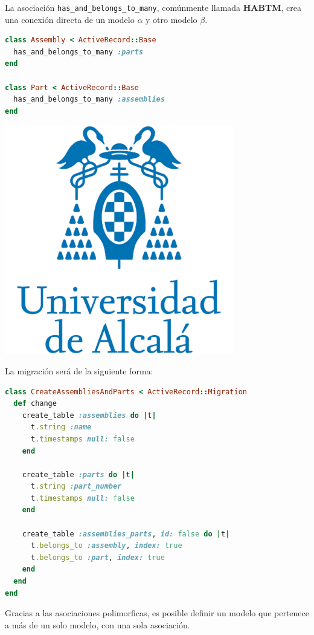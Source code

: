 La asociación \texttt{has\_and\_belongs\_to\_many}, comúnmente llamada \textbf{HABTM}, crea una conexión directa de un modelo $\alpha$ y otro modelo $\beta$.

\begin{lstlisting}[language=Ruby]
class Assembly < ActiveRecord::Base
  has_and_belongs_to_many :parts
end
 
class Part < ActiveRecord::Base
  has_and_belongs_to_many :assemblies
end
\end{lstlisting}

\includegraphics[width=10cm]{./image/logos/uahlogo3.png}

La migración será de la siguiente forma:

\begin{lstlisting}[language=Ruby]
class CreateAssembliesAndParts < ActiveRecord::Migration
  def change
    create_table :assemblies do |t|
      t.string :name
      t.timestamps null: false
    end
 
    create_table :parts do |t|
      t.string :part_number
      t.timestamps null: false
    end
 
    create_table :assemblies_parts, id: false do |t|
      t.belongs_to :assembly, index: true
      t.belongs_to :part, index: true
    end
  end
end
\end{lstlisting}


Gracias a las asociaciones polimorficas, es posible definir un modelo que pertenece a más de un solo modelo, con una sola asociación.


